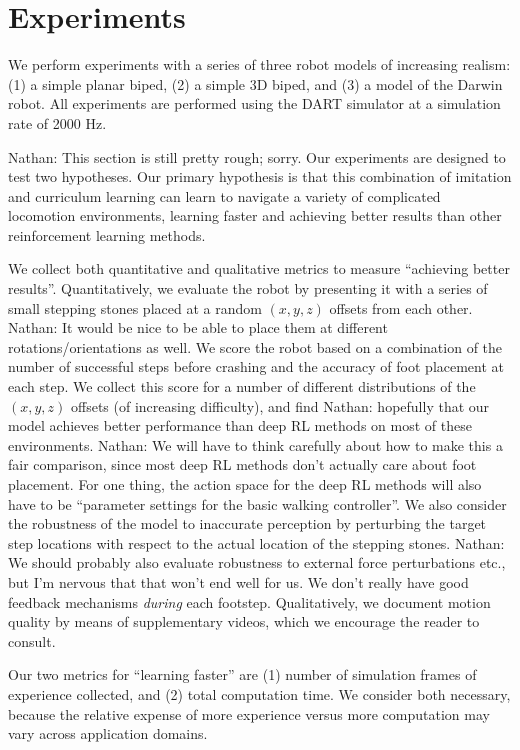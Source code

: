 \documentclass[a4paper]{article}
\newcommand{\nhatch}[1]{{\leavevmode\color{blue} Nathan: #1}}
\begin{document}
\section{Experiments}

We perform experiments with a series of three robot models of increasing realism: (1) a simple planar biped, (2) a simple 3D biped, and (3) a model of the Darwin robot.
All experiments are performed using the DART simulator at a simulation rate of 2000 Hz.

\nhatch{This section is still pretty rough; sorry.}
Our experiments are designed to test two hypotheses.
Our primary hypothesis is that this combination of imitation and curriculum learning can learn to navigate a variety of complicated locomotion environments, learning faster and achieving better results than other reinforcement learning methods.

We collect both quantitative and qualitative metrics to measure ``achieving better results''.
Quantitatively, we evaluate the robot by presenting it with a series of small stepping stones placed at a random $(x,y,z)$ offsets from each other.
\nhatch{It would be nice to be able to place them at different rotations/orientations as well.}
We score the robot based on a combination of the number of successful steps before crashing and the accuracy of foot placement at each step.
We collect this score for a number of different distributions of the $(x,y,z)$ offsets (of increasing difficulty), and find \nhatch{hopefully} that our model achieves better performance than deep RL methods on most of these environments.
\nhatch{We will have to think carefully about how to make this a fair comparison, since most deep RL methods don't actually care about foot placement. For one thing, the action space for the deep RL methods will also have to be ``parameter settings for the basic walking controller''.}
We also consider the robustness of the model to inaccurate perception by perturbing the target step locations with respect to the actual location of the stepping stones.
\nhatch{We should probably also evaluate robustness to external force perturbations etc., but I'm nervous that that won't end well for us. We don't really have good feedback mechanisms \emph{during} each footstep.}
Qualitatively, we document motion quality by means of supplementary videos, which we encourage the reader to consult.

Our two metrics for ``learning faster'' are (1) number of simulation frames of experience collected, and (2) total computation time.
We consider both necessary, because the relative expense of more experience versus more computation may vary across application domains.
\end{document}

